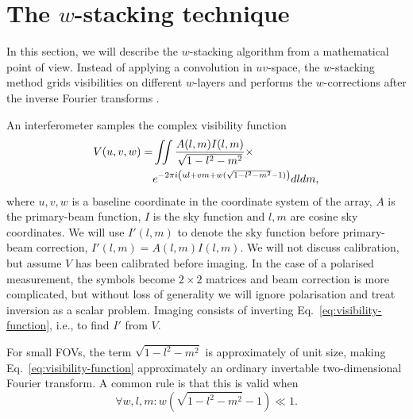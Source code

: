 \documentclass[useAMS,usenatbib]{mn2e}
\begin{document}
\section{The $w$-stacking technique} \label{sec:wstacking}
In this section, we will describe the $w$-stacking algorithm from a mathematical point of view. Instead of applying a convolution in $uv$-space, the $w$-stacking method grids visibilities on different $w$-layers and performs the $w$-corrections after the inverse Fourier transforms \citep{ska-memo-regridding-2011}.

An interferometer samples the complex visibility function
\begin{align}\notag
V(u,v,w) = & \iint \frac{A(l,m) I(l,m)}{\sqrt{1-l^2-m^2}} \times \\ \label{eq:visibility-function}
& e^{-2\pi i \left(ul + vm + w(\sqrt{1-l^2-m^2}-1)\right)} dl dm,
\end{align}
where $u,v,w$ is a baseline coordinate in the coordinate system of the array, $A$ is the primary-beam function, $I$ is the sky function and $l,m$ are cosine sky coordinates. We will use $I'(l,m)$ to denote the sky function before primary-beam correction, $I'(l,m)=A(l,m)I(l,m)$. We will not discuss calibration, but assume $V$ has been calibrated before imaging. In the case of a polarised measurement, the symbols become $2\times 2$ matrices and beam correction is more complicated, but without loss of generality we will ignore polarisation and treat inversion as a scalar problem. Imaging consists of inverting Eq.~\eqref{eq:visibility-function}, i.e., to find $I'$ from $V$.

For small FOVs, the term $\sqrt{1-l^2-m^2}$ is approximately of unit size, making Eq.~\eqref{eq:visibility-function} approximately an ordinary invertable two-dimensional Fourier transform. A common rule is that this is valid when
\begin{equation}\label{eq:when-2d-is-valid}
\forall w,l,m: w\left(\sqrt{1-l^2-m^2}-1\right) \ll 1.
\end{equation}
\end{document}
